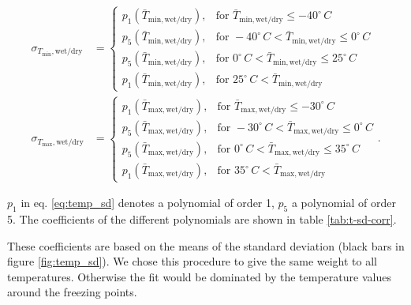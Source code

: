 \begin{refsection}
\begin{align}
\sigma_{T_\mathrm{min},\mathrm{wet/dry}} &= \begin{cases}
p_1(\bar{T}_{\mathrm{min}, \mathrm{wet/dry}}), & \text{for } \bar{T}_{\mathrm{min}, \mathrm{wet/dry}} \leq -40^\circ\, C \\
p_5(\bar{T}_{\mathrm{min}, \mathrm{wet/dry}}), & \text{for } -40^\circ\, C < \bar{T}_{\mathrm{min}, \mathrm{wet/dry}} \leq 0^\circ\, C \\
p_5(\bar{T}_{\mathrm{min}, \mathrm{wet/dry}}), & \text{for } 0^\circ\, C < \bar{T}_{\mathrm{min}, \mathrm{wet/dry}} \leq 25^\circ\, C \\
p_1(\bar{T}_{\mathrm{min}, \mathrm{wet/dry}}), & \text{for } 25^\circ\, C < \bar{T}_{\mathrm{min}, \mathrm{wet/dry}}
\end{cases} \nonumber \\
\sigma_{T_\mathrm{max},\mathrm{wet/dry}} &= \begin{cases}
p_1(\bar{T}_{\mathrm{max}, \mathrm{wet/dry}}), & \text{for } \bar{T}_{\mathrm{max}, \mathrm{wet/dry}} \leq -30^\circ\, C \\
p_5(\bar{T}_{\mathrm{max}, \mathrm{wet/dry}}), & \text{for } -30^\circ\, C < \bar{T}_{\mathrm{max}, \mathrm{wet/dry}} \leq 0^\circ\, C \\
p_5(\bar{T}_{\mathrm{max}, \mathrm{wet/dry}}), & \text{for } 0^\circ\, C < \bar{T}_{\mathrm{max}, \mathrm{wet/dry}} \leq 35^\circ\, C \\
p_1(\bar{T}_{\mathrm{max}, \mathrm{wet/dry}}), & \text{for } 35^\circ\, C < \bar{T}_{\mathrm{max}, \mathrm{wet/dry}}
\end{cases}. \label{eq:temp_sd}
\end{align}

$p_1$ in eq. \eqref{eq:temp_sd} denotes a polynomial of order 1, $p_5$ a polynomial of order 5. The coefficients of the different polynomials are shown in table \ref{tab:t-sd-corr}.

These coefficients are based on the means of the standard deviation (black bars in figure \ref{fig:temp_sd}). We chose this procedure to give the same weight to all temperatures. Otherwise the fit would be dominated by the temperature values around the freezing points.


\end{refsection}
